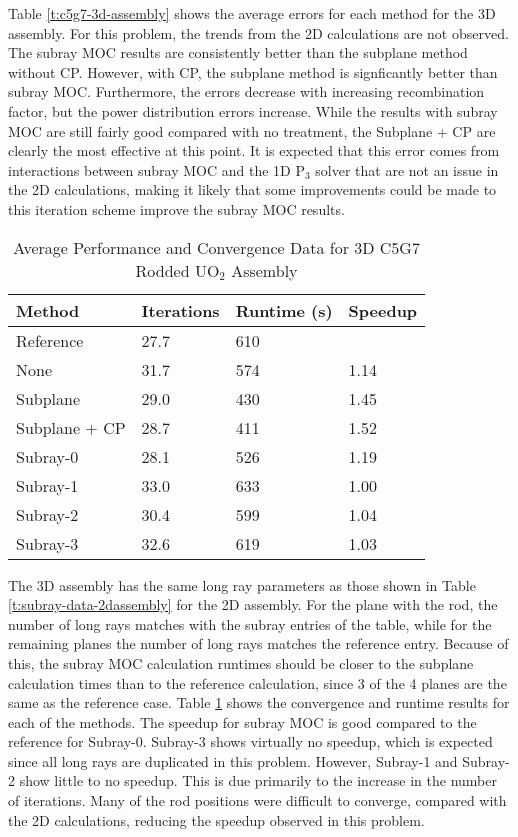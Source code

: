 Table \ref{t:c5g7-3d-assembly} shows the average errors for each method for the 3D assembly.  For this problem, the trends from the 2D calculations are not observed.  The subray MOC results are consistently better than the subplane method without CP.  However, with CP, the subplane method is signficantly better than subray MOC.  Furthermore, the \keff{} errors decrease with increasing recombination factor, but the power distribution errors increase.  While the results with subray MOC are still fairly good compared with no treatment, the Subplane + CP are clearly the most effective at this point.  It is expected that this error comes from interactions between subray MOC and the 1D P$_3$ solver that are not an issue in the 2D calculations, making it likely that some improvements could be made to this iteration scheme improve the subray MOC results.

\begin{table}[h]
    \centering
    \caption{Average Performance and Convergence Data for 3D C5G7 Rodded UO$_2$ Assembly}\label{t:subray-performance-3Dassembly}
    \begin{tabular}{l l l l}\toprule
        Method & Iterations & Runtime (s) & Speedup \\\midrule
Reference     & 27.7 & 610 &      \\
None          & 31.7 & 574 & 1.14 \\
Subplane      & 29.0 & 430 & 1.45 \\
Subplane + CP & 28.7 & 411 & 1.52 \\
Subray-0      & 28.1 & 526 & 1.19 \\
Subray-1      & 33.0 & 633 & 1.00 \\
Subray-2      & 30.4 & 599 & 1.04 \\
Subray-3      & 32.6 & 619 & 1.03 \\
        \bottomrule
    \end{tabular}
\end{table}

The 3D assembly has the same long ray parameters as those shown in Table \ref{t:subray-data-2dassembly} for the 2D assembly.  For the plane with the rod, the number of long rays matches with the subray entries of the table, while for the remaining planes the number of long rays matches the reference entry.  Because of this, the subray MOC calculation runtimes should be closer to the subplane calculation times than to the reference calculation, since 3 of the 4 planes are the same as the reference case.  Table \ref{t:subray-performance-3Dassembly} shows the convergence and runtime results for each of the methods.  The speedup for subray MOC is good compared to the reference for Subray-0.  Subray-3 shows virtually no speedup, which is expected since all long rays are duplicated in this problem.  However, Subray-1 and Subray-2 show little to no speedup.  This is due primarily to the increase in the number of iterations.  Many of the rod positions were difficult to converge, compared with the 2D calculations, reducing the speedup observed in this problem.